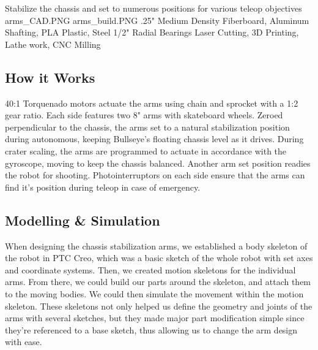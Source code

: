 {Stabilize the chassis and set to numerous positions for various teleop objectives} %
{arms_CAD.PNG}%
{arms_build.PNG}%
{.25" Medium Density Fiberboard, Aluminum Shafting, PLA Plastic, Steel 1/2" Radial Bearings}%
{Laser Cutting, 3D Printing, Lathe work, CNC Milling}%



\subsection*{How it Works}
40:1 Torquenado motors actuate the arms using chain and sprocket with a 1:2 gear ratio. Each side features two 8" arms with skateboard wheels. Zeroed perpendicular to the chassis, the arms set to a natural stabilization position during autonomous, keeping Bullseye's floating chassis level as it drives. During crater scaling, the arms are programmed to actuate in accordance with the gyroscope, moving to keep the chassis balanced. Another arm set position readies the robot for shooting. Photointerruptors on each side ensure that the arms can find it's position during teleop in case of emergency.   

\subsection*{Modelling \& Simulation}
When designing the chassis stabilization arms, we established a body skeleton of the robot in PTC Creo, which was a basic sketch of the whole robot with set axes and coordinate systems. Then, we created motion skeletons for the individual arms. From there, we could build our parts around the skeleton, and attach them to the moving bodies. We could then simulate the movement within the motion skeleton. These skeletons not only helped us define the geometry and joints of the arms with several sketches, but they made major part modification simple since they're referenced to a base sketch, thus allowing us to change the arm design with ease. 

